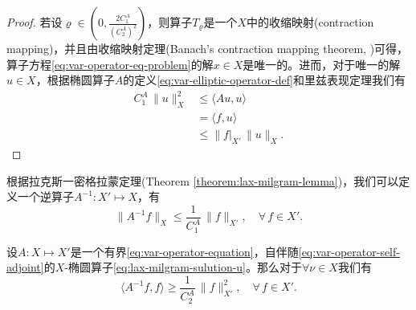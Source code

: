 \begin{proof}
若设$\varrho \in \left(0, \frac{2 C_1^A}{\left( C_2^A \right)^2} \right)$，则算子$T_{\varrho}$是一个$X$中的收缩映射(contraction mapping)，并且由收缩映射定理(Banach's contraction mapping theorem, \cite{Palais:2007bo})可得，算子方程\eqref{eq:var-operator-eq-problem}的解$x \in X$是唯一的。进而，对于唯一的解$u \in X$，根据椭圆算子$A$的定义\eqref{eq:var-elliptic-operator-def}和里兹表现定理我们有
\begin{equation*}
  \begin{split}
    C_1^A \, \big\| u \big\|_{X}^2 &\le \langle Au,u \rangle \\
    &=\langle f, u \rangle \\
    &\le \big\| f \big|_{X'} \, \big\| u \big\|_{X}.
  \end{split}
\end{equation*}
\end{proof}

根据拉克斯一密格拉蒙定理(Theorem \ref{theorem:lax-milgram-lemma})，我们可以定义一个逆算子$A^{-1}:X' \mapsto X$，有
\begin{equation*}
  \big\| A^{-1} f \big\|_{X} \le \frac{1}{C_1^A} \, \big\| f \big\|_{X'}, \quad \forall \, f \in X'.
\end{equation*}
\begin{lemma}
设$A:X \mapsto X'$是一个有界\eqref{eq:var-operator-equation}，自伴随\eqref{eq:var-operator-self-adjoint}的$X$-椭圆算子\eqref{eq:lax-milgram-sulution-u}。那么对于$\forall \nu \in X$我们有
\begin{equation*}
  \langle A^{-1} f, f \rangle \ge \frac{1}{C_2^A} \, \big\| f \big\|_{X'}^2, \quad \forall \, f \in X'.
\end{equation*}
\end{lemma}

